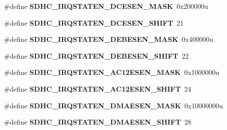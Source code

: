 \begin{DoxyCompactItemize}
\item 
\#define {\bfseries S\+D\+H\+C\+\_\+\+I\+R\+Q\+S\+T\+A\+T\+E\+N\+\_\+\+D\+C\+E\+S\+E\+N\+\_\+\+M\+A\+SK}~0x200000u\hypertarget{group__SDHC__Register__Masks_ga8a3e8003463ce6afcf39fef7e4938377}{}\label{group__SDHC__Register__Masks_ga8a3e8003463ce6afcf39fef7e4938377}

\item 
\#define {\bfseries S\+D\+H\+C\+\_\+\+I\+R\+Q\+S\+T\+A\+T\+E\+N\+\_\+\+D\+C\+E\+S\+E\+N\+\_\+\+S\+H\+I\+FT}~21\hypertarget{group__SDHC__Register__Masks_ga0050daa198388d3a52844f1626e0fd75}{}\label{group__SDHC__Register__Masks_ga0050daa198388d3a52844f1626e0fd75}

\item 
\#define {\bfseries S\+D\+H\+C\+\_\+\+I\+R\+Q\+S\+T\+A\+T\+E\+N\+\_\+\+D\+E\+B\+E\+S\+E\+N\+\_\+\+M\+A\+SK}~0x400000u\hypertarget{group__SDHC__Register__Masks_ga1a3c5402282178d4d694355f5bca0870}{}\label{group__SDHC__Register__Masks_ga1a3c5402282178d4d694355f5bca0870}

\item 
\#define {\bfseries S\+D\+H\+C\+\_\+\+I\+R\+Q\+S\+T\+A\+T\+E\+N\+\_\+\+D\+E\+B\+E\+S\+E\+N\+\_\+\+S\+H\+I\+FT}~22\hypertarget{group__SDHC__Register__Masks_ga7911ed6d7633685d285f4934e301bde6}{}\label{group__SDHC__Register__Masks_ga7911ed6d7633685d285f4934e301bde6}

\item 
\#define {\bfseries S\+D\+H\+C\+\_\+\+I\+R\+Q\+S\+T\+A\+T\+E\+N\+\_\+\+A\+C12\+E\+S\+E\+N\+\_\+\+M\+A\+SK}~0x1000000u\hypertarget{group__SDHC__Register__Masks_gab127f67378a192bb2db22591ef7d39f7}{}\label{group__SDHC__Register__Masks_gab127f67378a192bb2db22591ef7d39f7}

\item 
\#define {\bfseries S\+D\+H\+C\+\_\+\+I\+R\+Q\+S\+T\+A\+T\+E\+N\+\_\+\+A\+C12\+E\+S\+E\+N\+\_\+\+S\+H\+I\+FT}~24\hypertarget{group__SDHC__Register__Masks_ga14c140e22b678c345119a68af9bef146}{}\label{group__SDHC__Register__Masks_ga14c140e22b678c345119a68af9bef146}

\item 
\#define {\bfseries S\+D\+H\+C\+\_\+\+I\+R\+Q\+S\+T\+A\+T\+E\+N\+\_\+\+D\+M\+A\+E\+S\+E\+N\+\_\+\+M\+A\+SK}~0x10000000u\hypertarget{group__SDHC__Register__Masks_ga3f042673e4eb942992f5f5c670e3f3d7}{}\label{group__SDHC__Register__Masks_ga3f042673e4eb942992f5f5c670e3f3d7}

\item 
\#define {\bfseries S\+D\+H\+C\+\_\+\+I\+R\+Q\+S\+T\+A\+T\+E\+N\+\_\+\+D\+M\+A\+E\+S\+E\+N\+\_\+\+S\+H\+I\+FT}~28\hypertarget{group__SDHC__Register__Masks_gaeaf5be970bbb56b0ccbae03ece8dede6}{}\label{group__SDHC__Register__Masks_gaeaf5be970bbb56b0ccbae03ece8dede6}


\end{DoxyCompactItemize}
